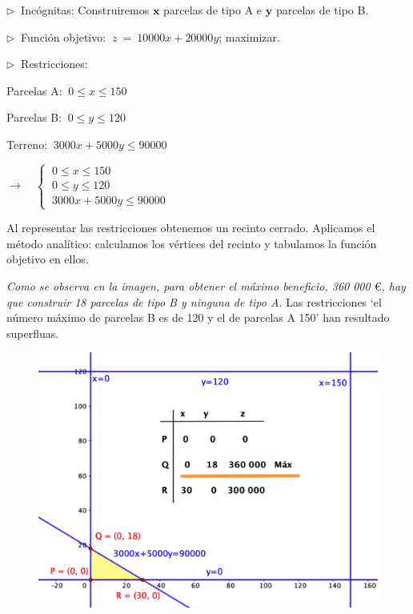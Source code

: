 \vspace{3mm} $\triangleright \ $ Incógnitas: Construiremos $\boldsymbol x$ parcelas de tipo A e $\boldsymbol y$ parcelas de tipo B.

\vspace{3mm} $\triangleright \ $ Función objetivo: $\ z \ = \ 10000x + 20000y$; maximizar.

\vspace{3mm} $\triangleright \ $  Restricciones:

\begin{multicols}{2}
Parcelas A: $\ 0 \le x \le 150$

Parcelas B: $\ 0 \le y \le 120$

Terreno: $\ 3000x+5000y\le 90000$

$\to \quad \begin{cases} \ 0\le x \le 150 \\ \ 0\le y \le 120 \\ \ 3000x+5000y\le 90000 \end{cases}$  	
\end{multicols}


\vspace{3mm} Al representar las restricciones obtenemos un recinto cerrado. Aplicamos el método analítico: calculamos los vértices del recinto y tabulamos la función objetivo en ellos.

\vspace{3mm} \emph{Como se observa en la imagen, para obtener el máximo beneficio, 360 000 $\euro$, hay que construir 18 parcelas de tipo B y ninguna de tipo A.}
Las restricciones `el número máximo de parcelas B es de 120 y el de parcelas A 150' han resultado superfluas. 

\begin{figure}[H]
	\centering
	\includegraphics[width=.75\textwidth]{imagenes/img41.png}
\end{figure}


